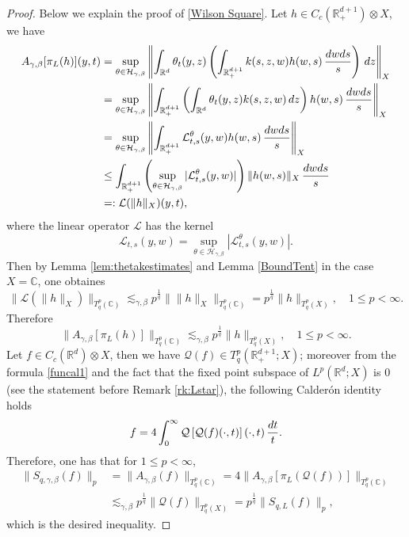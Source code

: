 \documentclass[oneside,english,a4wide]{amsart}
\numberwithin{equation}{section}
\numberwithin{figure}{section}
\theoremstyle{plain}
\theoremstyle{plain}
\theoremstyle{definition}
\theoremstyle{plain}
\theoremstyle{remark}
\theoremstyle{definition}
\theoremstyle{remark}
\theoremstyle{definition}
\newcommand{\real}{{\mathbb R}}
\newcommand{\com}{{\mathbb C}}
\renewcommand{\L}{{\mathcal L}}
\newcommand{\Q}{{\mathcal Q}}
\newcommand{\8}{+\infty}
\renewcommand{\1}{\mathbbm{1}}
\newcommand\norm[1]{ \left\| #1 \right\| }
\newcommand\sk[1]{ \left( #1 \right) }
\newcommand\mk[1]{ \left[ #1 \right] }
\renewcommand\d{{\rm d}}
\begin{document}
{\begin{proof}
Below we explain the proof of \eqref{Wilson Square}. Let $h \in C_c(\real^{d+1}_+)\otimes X$, we have
    \[
    \begin{aligned}
        A_{\gamma, \beta}[\pi_L(h)](y, t) & = \sup_{\theta \in \mathcal{H}_{\gamma, \beta}} \norm{ \int_{\real^d}\theta_t(y, z)\sk{ \int_{\real^{d+1}_+} k(s, z, w)h(w, s)\, \frac{\d w\d s}{s} } \,\d z }_X \\
        & = \sup_{\theta \in \mathcal{H}_{\gamma, \beta}} \norm{ \int_{\real^{d+1}_+} \sk{ \int_{\real^d}\theta_t(y, z)k(s, z, w)\,\d z } h(w, s)\, \frac{\d w\d s}{s} }_X \\
        & = \sup_{\theta \in \mathcal{H}_{\gamma, \beta}} \norm{ \int_{\real^{d+1}_+} \L^\theta_{t, s}(y, w) h(w, s)\, \frac{\d w\d s}{s} }_X \\
        & \leq \int_{\real^{d+1}_+} \sk{ \sup_{\theta \in \mathcal{H}_{\gamma, \beta}} |\L^\theta_{t, s}(y, w)| }\| h(w, s) \|_X\, \frac{\d w\d s}{s} \\
        & =: \L( \| h \|_X )(y, t),
    \end{aligned}
    \]
where the linear operator $\L$ has the kernel 
\[
    \L_{t,s}(y,w)=\sup_{\theta \in \mathcal{H}_{\gamma, \beta}}|\L^\theta_{t, s}(y, w)|.
\]
Then by Lemma \ref{lem:thetakestimates} and Lemma \ref{BoundTent} in the case $X = \com$, one obtaines
    \[
        \| \L( \| h \|_X ) \|_{T^p_q(\com)} \lesssim_{\gamma, \beta}p^{\frac{1}{q}} \| \|h\|_X \|_{T^p_q(\com)} =  p^{\frac{1}{q}}\| h \|_{T^p_q(X)},  \quad 1 \leq p < \infty.
    \]
    Therefore
    \[
        \| A_{\gamma, \beta}[\pi_L(h)] \|_{T^p_q(\com)} \lesssim_{\gamma, \beta} p^{\frac{1}{q}}\| h \|_{T^p_q(X)},  \quad 1 \leq p < \infty.
    \]
Let $f \in C_c(\mathbb R^d)\otimes X$, then we have $\Q(f) \in T^p_q(\real^{d+1}_+; X)$; {moreover from the formula \eqref{funcal1} and the fact that the fixed point subspace of $L^p(\mathbb R^d; X)$ is $0$ (see the statement before Remark \ref{rk:Lstar}), the following Calder\'on identity holds
\begin{equation}\label{funcal}
    f= 4 \int_{0}^{\infty} \Q\mk{\Q(f)(\cdot, t)}(\cdot, t) \,\frac{\d t}{t}.
\end{equation}}
Therefore, one has that for $1 \leq p < \infty$,
    \[
    \begin{aligned}
        \| S_{q, \gamma, \beta}(f) \|_p & = \| A_{\gamma, \beta}(f) \|_{T^p_q(\com)} = 4\| A_{\gamma, \beta}\mk{ \pi_L(\Q(f)) } \|_{T^p_q(\com)} \\
        & \lesssim_{\gamma, \beta} p^{\frac{1}{q}}\| \Q(f) \|_{T^p_q(X)} = p^{\frac{1}{q}}\| S_{q,L}(f) \|_p,
    \end{aligned}
    \]
    which is the desired inequality.
\end{proof}

}
\end{document}
